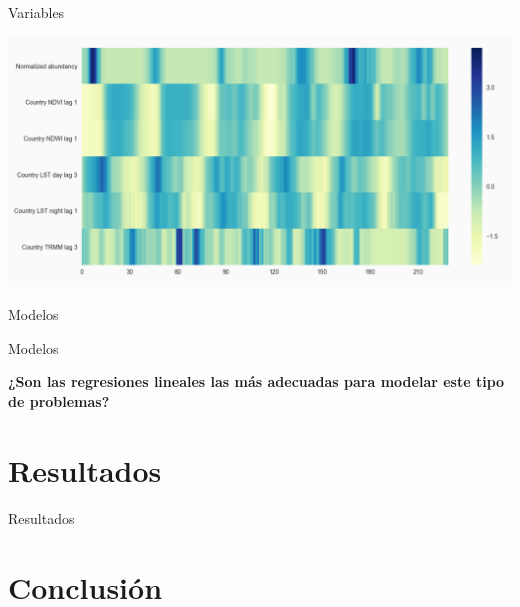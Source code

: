 \documentclass[10pt]{beamer}
\begin{document}
\begin{frame}{Variables}


  \includegraphics[width=1\textwidth]{selected_variables.png}


\end{frame}

\begin{frame}{Modelos}
\end{frame}

\begin{frame}{Modelos}
  \begin{center}
    \textbf{¿Son las regresiones lineales las más adecuadas para modelar este
      tipo de problemas?}
  \end{center}
\end{frame}

\section{Resultados}

\begin{frame}{Resultados}
\end{frame}

\section{Conclusión}
\end{document}
